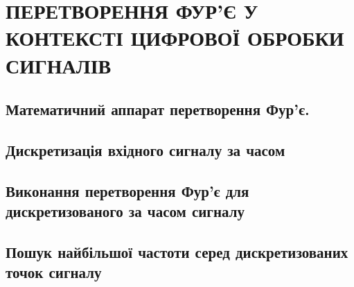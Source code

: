 \section{ПЕРЕТВОРЕННЯ ФУР'Є У КОНТЕКСТІ ЦИФРОВОЇ ОБРОБКИ СИГНАЛІВ}

\subsection{Математичний аппарат перетворення Фур'є.}

\lipsum[1]

\subsection{Дискретизація вхідного сигналу за часом}

\lipsum[1]

\subsection{Виконання перетворення Фур'є для дискретизованого за часом сигналу}

\lipsum[1]

\subsection{Пошук найбільшої частоти серед дискретизованих точок сигналу}

\lipsum[1]





